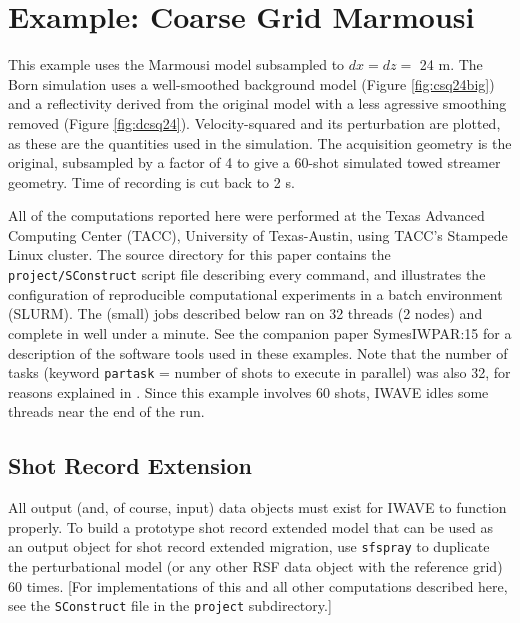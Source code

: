 
\section{Example: Coarse Grid Marmousi}
This example uses the Marmousi model subsampled to $dx = dz = $ 24 m. The Born simulation  uses a well-smoothed background model (Figure \ref{fig:csq24big}) and a reflectivity derived from the original model with a less agressive smoothing removed (Figure \ref{fig:dcsq24}). Velocity-squared and its perturbation are plotted, as these are the quantities used in the simulation. The acquisition geometry is the original, subsampled by a factor of 4 to give a 60-shot simulated towed streamer geometry. Time of recording is cut back to 2 s.


All of the computations reported here were performed at the Texas Advanced Computing Center (TACC), University of Texas-Austin, using TACC's Stampede Linux cluster. The source directory for this paper contains the {\tt project/SConstruct} script file describing every command, and illustrates the configuration of reproducible computational experiments in a batch environment (SLURM). The (small) jobs described below ran on 32 threads (2 nodes) and complete in well under a minute. See the companion paper \cite{}{SymesIWPAR:15} for a description of the software tools used in these examples. Note that the number of tasks (keyword {\tt partask} = number of shots to execute in parallel) was also 32, for reasons explained in \cite[]{SymesIWPAR:15}. Since this example involves 60 shots, IWAVE idles some threads near the end of the run.

\subsection{Shot Record Extension}
All output (and, of course, input) data objects must exist for IWAVE to function properly. To build a prototype shot record extended model that can be used as an output object for shot record extended migration, use {\tt sfspray} to duplicate the perturbational model (or any other RSF data object with the reference grid) 60 times. [For implementations of this and all other computations described here, see the {\tt SConstruct} file in the {\tt project} subdirectory.] 

